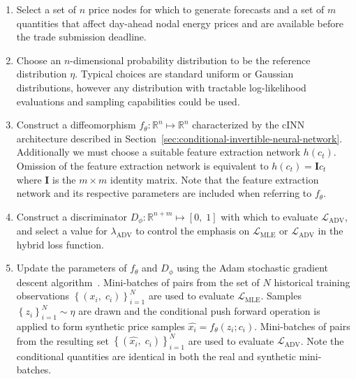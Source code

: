 \begin{enumerate}
    \item Select a set of $n$ price nodes for which to generate forecasts and a set of $m$ quantities
    that affect day-ahead nodal energy prices and are available before the trade submission deadline.

    \item Choose an $n$-dimensional probability distribution to be the reference distribution $\eta$.
    Typical choices are standard uniform or Gaussian distributions, however any distribution with tractable
    log-likelihood evaluations and sampling capabilities could be used.

    \item Construct a diffeomorphism $f_\theta : \mathbb{R}^n \mapsto \mathbb{R}^n$ characterized by the cINN architecture
    described in Section~\ref{sec:conditional-invertible-neural-network}.
    Additionally we must choose a suitable feature extraction network $h(c_t)$.
    Omission of the feature extraction network is equivalent to $h(c_t) = \mathbf{I}c_t$ where $\mathbf{I}$
    is the $m \times m$ identity matrix.
    Note that the feature extraction network and its respective parameters are included when referring to $f_\theta$.

    \item Construct a discriminator $D_\phi : \mathbb{R}^{n + m} \mapsto [0,\;1]$ with which to evaluate $\mathcal{L}_{\text{ADV}}$,
    and select a value for $\lambda_{\text{ADV}}$ to control the emphasis on $\mathcal{L}_{\text{MLE}}$ or
    $\mathcal{L}_{\text{ADV}}$ in the hybrid loss function.

    \item Update the parameters of $f_\theta$ and $D_\phi$ using the Adam stochastic gradient descent algorithm~\cite{adam_optim}.
    Mini-batches of pairs from the set of $N$ historical training observations
    $\left\{ \left( x_i,\; c_i \right) \right\}_{i=1}^N$ are used to evaluate $\mathcal{L}_{\text{MLE}}$.
    Samples $\left\{ z_i \right\}_{i=1}^N \sim \eta$ are drawn and the conditional push forward operation is applied
    to form synthetic price samples $\hat{x_i} = f_\theta(z_i; c_i)$.
    Mini-batches of pairs from the resulting set $\left\{ \left(\hat{x_i},\; c_i \right) \right\}_{i=1}^N$ are used to
    evaluate $\mathcal{L}_{\text{ADV}}$.
    Note the conditional quantities are identical in both the real and synthetic mini-batches.
\end{enumerate}

